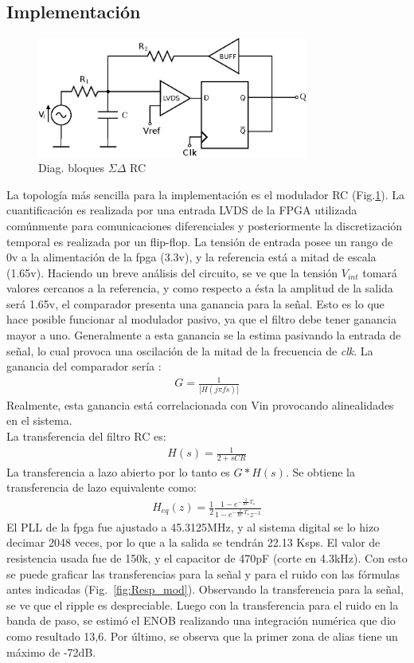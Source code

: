 \documentclass[a4paper,conference]{IEEEtran}
\begin{document}
\subsection{Implementaci\'on}

\begin{figure}[!t]
\centering
\includegraphics[width=3.5in]{Sigma-Delta_RC}
\caption{Diag. bloques $\Sigma\Delta$ RC}
\label{fig_SDRC}
\end{figure}

La topolog\'ia m\'as sencilla para la implementaci\'on es el modulador RC (Fig.\ref{fig_SDRC}). La cuantificaci\'on es realizada por una entrada LVDS de la FPGA\cite{Sp6-IO} utilizada com\'unmente para comunicaciones diferenciales y posteriormente la discretizaci\'on temporal es realizada por un flip-flop. La tensi\'on de entrada posee un rango de 0v a la alimentación de la fpga (3.3v), y la referencia está a mitad de escala (1.65v).  Haciendo un breve an\'alisis del circuito, se ve que la tensi\'on $V_{int}$ tomar\'a valores cercanos a la referencia, y como respecto a \'esta la amplitud de la salida ser\'a 1.65v, el comparador presenta una ganancia para la se\~nal. Esto es lo que hace posible funcionar al modulador pasivo, ya que el filtro debe tener ganancia mayor a uno. Generalmente a esta ganancia se la estima pasivando la entrada de señal, lo cual provoca una oscilación de la mitad de la frecuencia de \textit{clk}. La ganancia del comparador ser\'ia :
\begin{align}
G=\frac{1}{|H(j\pi fs)|}
\end{align}
Realmente, esta ganancia está correlacionada con Vin provocando alinealidades en el sistema.\\
La transferencia del filtro RC es:
\begin{align}
H(s)=\frac{1}{2+sCR}
\end{align}
La transferencia a lazo abierto por lo tanto es $G*H(s)$. 
Se obtiene la transferencia de lazo equivalente como:
\begin{align}
H_{eq}(z)=\frac{1}{2}\frac{1-e^{-\frac{2}{RC}T_s}}{1-e^{-\frac{2}{RC}T_s}z^{-1}}
\end{align}
El PLL de la fpga fue ajustado a 45.3125MHz, y al sistema digital se lo hizo decimar 2048 veces, por lo que a la salida se tendrán 22.13 Ksps. El valor de resistencia usada fue de 150k, y el capacitor de 470pF (corte en 4.3kHz).
Con esto se puede graficar las transferencias para la señal y para el ruido con las fórmulas antes indicadas (Fig.~\ref{fig:Resp_mod}). Observando la transferencia para la señal, se ve que el ripple es despreciable. Luego con la transferencia para el ruido en la banda de paso, se estimó el ENOB realizando una integraci\'on num\'erica que dio como resultado 13,6. Por último, se observa que la primer zona de alias tiene un m\'aximo de -72dB.
\end{document}
